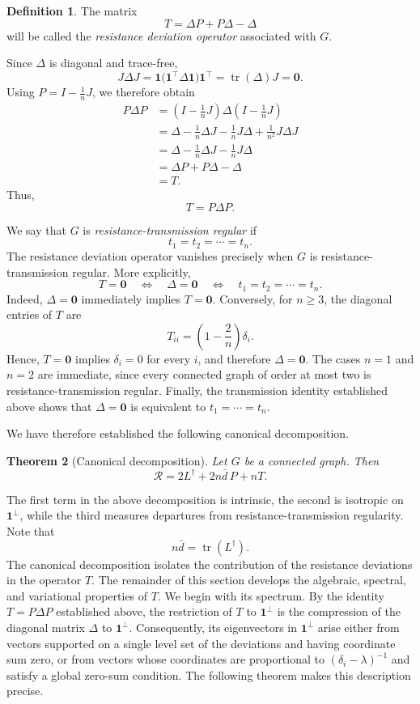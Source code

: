 \documentclass[12pt,a4paper]{amsart}
\newtheorem{theorem}{Theorem}[section]
\theoremstyle{remark}
\theoremstyle{definition}
\newtheorem{definition}[theorem]{Definition}
\newcommand{\1}{\mathbf{1}}
\newcommand{\0}{\mathbf{0}}
\newcommand{\tr}{\operatorname{tr}}
\begin{document}
\begin{definition}
The matrix
\[
T=\Delta P+P\Delta-\Delta
\]
will be called the \emph{resistance deviation operator} associated
with $G$.
\end{definition}

Since $\Delta$ is diagonal and trace-free,
\[
J\Delta J
=
\mathbf{1}
\bigl(\mathbf{1}^{\top}\Delta\mathbf{1}\bigr)
\mathbf{1}^{\top}
=
\operatorname{tr}(\Delta)J
=
\mathbf{0}.
\]
Using $P=I-\frac{1}{n}J$, we therefore obtain
\[
\begin{aligned}
P\Delta P
&=
\left(I-\frac{1}{n}J\right)
\Delta
\left(I-\frac{1}{n}J\right)\\
&=
\Delta-\frac{1}{n}\Delta J-\frac{1}{n}J\Delta
+\frac{1}{n^2}J\Delta J\\
&=
\Delta-\frac{1}{n}\Delta J-\frac{1}{n}J\Delta\\
&=
\Delta P+P\Delta-\Delta\\
&=
T.
\end{aligned}
\]
Thus,
\[
T=P\Delta P.
\]

We say that $G$ is \emph{resistance-transmission regular} if
\[
t_1=t_2=\cdots=t_n.
\]
The resistance deviation operator vanishes precisely when $G$ is
resistance-transmission regular. More explicitly,
\[
T=\mathbf{0}
\quad\Longleftrightarrow\quad
\Delta=\mathbf{0}
\quad\Longleftrightarrow\quad
t_1=t_2=\cdots=t_n.
\]
Indeed, $\Delta=\mathbf{0}$ immediately implies $T=\mathbf{0}$.
Conversely, for $n\geq 3$, the diagonal entries of $T$ are
\[
T_{ii}=\left(1-\frac{2}{n}\right)\delta_i.
\]
Hence, $T=\mathbf{0}$ implies $\delta_i=0$ for every $i$, and therefore
$\Delta=\mathbf{0}$. The cases $n=1$ and $n=2$ are immediate, since
every connected graph of order at most two is
resistance-transmission regular. Finally, the transmission identity
established above shows that $\Delta=\mathbf{0}$ is equivalent to
$t_1=\cdots=t_n$.

We have therefore established the following canonical decomposition.

\begin{theorem}[Canonical decomposition]
\label{canonical decomposition}
Let $G$ be a connected graph. Then
\[
\mathcal{R}=2L^\dagger+2n\bar d\,P+nT.
\]
\end{theorem}

The first term in the above decomposition is intrinsic, the second is
isotropic on $\mathbf{1}^{\perp}$, while the third measures departures
from resistance-transmission regularity. Note that
\[
n\bar d=\tr(L^\dagger).
\]
The canonical decomposition isolates the contribution of the resistance
deviations in the operator $T$. The remainder of this section develops
the algebraic, spectral, and variational properties of $T$. We begin
with its spectrum. By the identity $T=P\Delta P$ established above,
the restriction of $T$ to $\mathbf{1}^{\perp}$ is the compression of
the diagonal matrix $\Delta$ to $\mathbf{1}^{\perp}$. Consequently,
its eigenvectors in $\mathbf{1}^{\perp}$ arise either from vectors
supported on a single level set of the deviations and having coordinate
sum zero, or from vectors whose coordinates are proportional to
$(\delta_i-\lambda)^{-1}$ and satisfy a global zero-sum condition.
The following theorem makes this description precise.
\end{document}
